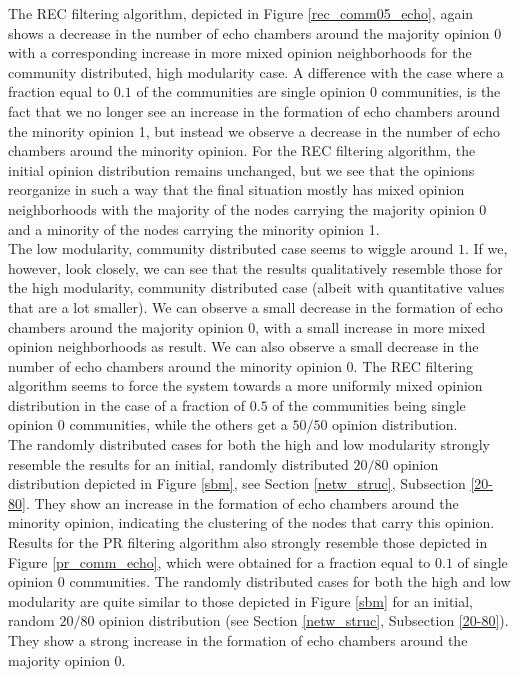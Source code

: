 \documentclass[11 pt , letterpaper , twoside , openright]{book}
\begin{document}
The REC filtering algorithm, depicted in Figure \ref{rec_comm05_echo}, again shows a decrease in the number of echo chambers around the majority opinion 0 with a corresponding increase in more mixed opinion neighborhoods for the community distributed, high modularity case. A difference with the case where a fraction equal to $0.1$ of the communities are single opinion 0 communities, is the fact that we no longer see an increase in the formation of echo chambers around the minority opinion 1, but instead we observe a decrease in the number of echo chambers around the minority opinion. For the REC filtering algorithm, the initial opinion distribution remains unchanged, but we see that the opinions reorganize in such a way that the final situation mostly has mixed opinion neighborhoods with the majority of the nodes carrying the majority opinion 0 and a minority of the nodes carrying the minority opinion 1. \\
The low modularity, community distributed case seems to wiggle around $1$. If we, however, look closely, we can see that the results qualitatively resemble those for the high modularity, community distributed case (albeit with quantitative values that are a lot smaller). We can observe a small decrease in the formation of echo chambers around the majority opinion 0, with a small increase in more mixed opinion neighborhoods as result. We can also observe a small decrease in the number of echo chambers around the minority opinion 0. The REC filtering algorithm seems to force the system towards a more uniformly mixed opinion distribution in the case of a fraction of $0.5$ of the communities being single opinion 0 communities, while the others get a $50/50$ opinion distribution.\\
The randomly distributed cases for both the high and low modularity strongly resemble the results for an initial, randomly distributed $20/80$ opinion distribution depicted in Figure \ref{sbm}, see Section \ref{netw_struc}, Subsection \ref{20-80}. They show an increase in the formation of echo chambers around the minority opinion, indicating the clustering of the nodes that carry this opinion.\\
\newline
Results for the PR filtering algorithm also strongly resemble those depicted in Figure \ref{pr_comm_echo}, which were obtained for a fraction equal to $0.1$ of single opinion 0 communities. The randomly distributed cases for both the high and low modularity are quite similar to those depicted in Figure \ref{sbm} for an initial, random $20/80$ opinion distribution (see Section \ref{netw_struc}, Subsection \ref{20-80}). They show a strong increase in the formation of echo chambers around the majority opinion 0.\\
\end{document}
